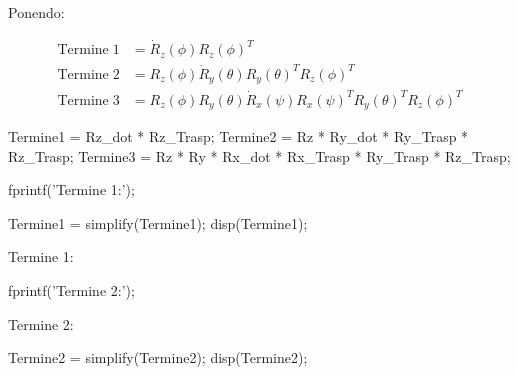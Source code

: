 \documentclass[11pt, a4paper]{article}
\begin{document}
\begin{par}
\begin{flushleft}
Ponendo:
\end{flushleft}
\end{par}
\[
\begin{aligned}
    \textrm{Termine}\;1 &= \dot{R}_z(\phi) R_z(\phi)^T \\
    \textrm{Termine}\;2 &= R_z(\phi) \dot{R}_y(\theta) R_y(\theta)^T R_z(\phi)^T \\
    \textrm{Termine}\;3 &= R_z(\phi) R_y(\theta) \dot{R}_x(\psi) R_x(\psi)^T R_y(\theta)^T R_z(\phi)^T
\end{aligned}
\]
\newpage
\begin{matlabcode}
Termine1 = Rz_dot * Rz_Trasp;
Termine2 = Rz * Ry_dot * Ry_Trasp * Rz_Trasp;
Termine3 = Rz * Ry * Rx_dot * Rx_Trasp * Ry_Trasp * Rz_Trasp;

fprintf('Termine 1:');

Termine1 = simplify(Termine1);
disp(Termine1);
\end{matlabcode}
\begin{matlaboutput}
Termine 1:
\end{matlaboutput}
\begin{matlabcode}

fprintf('Termine 2:');
\end{matlabcode}
\begin{matlaboutput}
Termine 2:
\end{matlaboutput}
\begin{matlabcode}
Termine2 = simplify(Termine2);
disp(Termine2);
\end{matlabcode}
\end{document}
